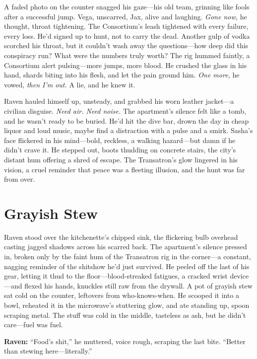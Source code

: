 \documentclass[12pt]{book}
\begin{document}
A faded photo on the counter snagged his gaze---his old team, grinning like fools after a successful jump. Vega, unscarred, Jax, alive and laughing. \textit{Gone now,} he thought, throat tightening. The Consortium’s leash tightened with every failure, every loss. He’d signed up to hunt, not to carry the dead. Another gulp of vodka scorched his throat, but it couldn’t wash away the questions---how deep did this conspiracy run? What were the numbers truly worth? The rig hummed faintly, a Consortium alert pulsing---more jumps, more blood. He crushed the glass in his hand, shards biting into his flesh, and let the pain ground him. \textit{One more,} he vowed, \textit{then I’m out.} A lie, and he knew it.

Raven hauled himself up, unsteady, and grabbed his worn leather jacket---a civilian disguise. \textit{Need air. Need noise.} The apartment’s silence felt like a tomb, and he wasn’t ready to be buried. He’d hit the dive bar, drown the day in cheap liquor and loud music, maybe find a distraction with a pulse and a smirk. Sasha’s face flickered in his mind---bold, reckless, a walking hazard---but damn if he didn’t crave it. He stepped out, boots thudding on concrete stairs, the city’s distant hum offering a shred of escape. The Transatron’s glow lingered in his vision, a cruel reminder that peace was a fleeting illusion, and the hunt was far from over.

\section{Grayish Stew}

Raven stood over the kitchenette’s chipped sink, the flickering bulb overhead casting jagged shadows across his scarred back. The apartment’s silence pressed in, broken only by the faint hum of the Transatron rig in the corner—a constant, nagging reminder of the shitshow he’d just survived. He peeled off the last of his gear, letting it thud to the floor—blood-streaked fatigues, a cracked wrist device—and flexed his hands, knuckles still raw from the drywall. A pot of grayish stew sat cold on the counter, leftovers from who-knows-when. He scooped it into a bowl, reheated it in the microwave’s stuttering glow, and ate standing up, spoon scraping metal. The stuff was cold in the middle, tasteless as ash, but he didn’t care—fuel was fuel.

\vspace{0.5em}
\textbf{Raven:} “Food’s shit,” he muttered, voice rough, scraping the last bite. “Better than stewing here—literally.”
\end{document}
